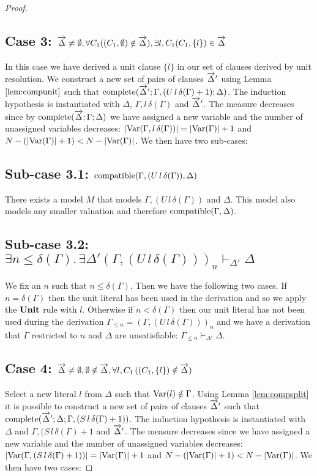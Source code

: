 \begin{mytheorem}
\begin{proof}
\subsection*{Case 3: $\overrightarrow{\Delta} \neq \emptyset, \forall C_1 ((C_1, \emptyset) \notin \overrightarrow{\Delta}), \exists l,C_1 (C_1 , \{ l \}) \in \overrightarrow{\Delta} $}
In this case we have derived a unit clause $\{ l \}$ in our set of clauses derived by unit resolution.  We construct a new set of pairs of clauses $\overrightarrow{\Delta}'$ using Lemma $\ref{lem:compunit}$ such that $\mathrm{complete}(\overrightarrow{\Delta}';\Gamma, (U \, l \, \delta(\Gamma) + 1); \Delta)$. 
%
The induction hypothesis is instantiated with $\Delta$, $\Gamma, l \, \delta(\Gamma)$ and $\overrightarrow{\Delta}'$. The measure decreases since by $\mathrm{complete}(\overrightarrow{\Delta};\Gamma; \Delta)$ we have assigned a new variable and the number of unassigned variables decreases: $ |\mathrm{Var}(\Gamma, l \, \delta(\Gamma))| = |\mathrm{Var}(\Gamma)| + 1$ and $N - (|\mathrm{Var}(\Gamma)| + 1) <  N - |\mathrm{Var}(\Gamma)|$.   We then have two sub-cases: 
%
\subsection*{Sub-case 3.1: $\mathrm{compatible}(\Gamma, (U \, l \, \delta(\Gamma)),\Delta)$}
There exists a model $M$ that models $\Gamma,( U \, l \, \delta(\Gamma))$ and $\Delta$. This model also models any smaller valuation and therefore $\mathrm{compatible}(\Gamma,\Delta)$.
\subsection*{Sub-case 3.2: $\exists n \leq \delta(\Gamma). \, \exists \Delta' (\Gamma, (U \, l \, \delta(\Gamma)))_n \vdash_{\Delta'} \Delta$}
We fix an $n$ such that $n \leq \delta(\Gamma)$. Then we have the following two cases. If $n = \delta(\Gamma)$ then the unit literal has been used in the derivation and so we apply the $\mathbf{Unit}$ rule with $l$. Otherwise if $n < \delta(\Gamma)$ 
then our unit literal has not been used during the derivation $\Gamma_{\leq n} = (\Gamma, (U \, l \, \delta(\Gamma)))_n$ and we have a derivation that $\Gamma$ restricted to $n$ and $\Delta$ are unsatisfiable: $\Gamma_{\leq n} \vdash_{\Delta'} \Delta$.
%
\subsection*{Case 4: $\overrightarrow{\Delta} \neq \emptyset, \emptyset \notin \overrightarrow{\Delta},  \forall l,C_1 \, ( (C_1 , \{ l \})  \notin \overrightarrow{\Delta} )$}
Select a new literal $l$ from $\Delta$ such that $\mathrm{Var}(l) \notin \Gamma$. Using Lemma \ref{lem:compsplit} it is possible to construct a new set of pairs of clauses $\overrightarrow{\Delta}'$ such that $\mathrm{complete}(\overrightarrow{\Delta}';\Delta; \Gamma, (S \, l \, \delta(\Gamma) + 1))$.
The induction hypothesis is instantiated with $\Delta$ and $ \Gamma, (S \, l \, \delta(\Gamma) + 1$ and $\overrightarrow{\Delta}'$. The measure decreases since we have assigned a new variable and the number of unassigned variables decreases: $ |\mathrm{Var}(\Gamma, ( S \, l \, \delta(\Gamma) + 1))| = |\mathrm{Var}(\Gamma)| + 1$ and $N - (|\mathrm{Var}(\Gamma)| + 1) <  N - |\mathrm{Var}(\Gamma)|$.  We then have two cases:
%

\end{proof}
\end{mytheorem}
